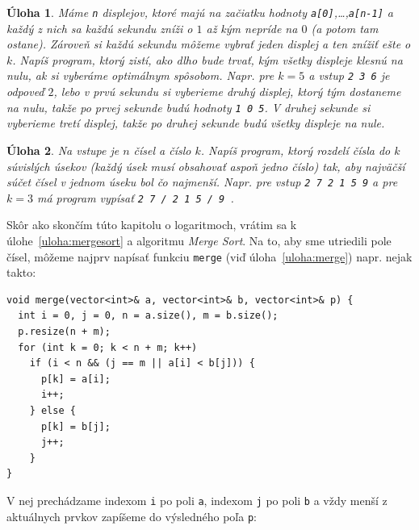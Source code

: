 \documentclass[10pt]{article}
\def\ods{\vspace*{10pt}}
\newtheorem{uloha}{Úloha}
\begin{document}
\begin{uloha}
  Máme {\tt n} displejov, ktoré majú na začiatku hodnoty {\tt a[0]},\ldots,{\tt a[n-1]}
  a každý z nich sa každú sekundu zníži o $1$ až kým nepríde na $0$ (a potom tam ostane).
  Zároveň si každú sekundu môžeme vybrať jeden displej a ten znížiť ešte o $k$.
  Napíš program, ktorý zistí, ako dlho bude trvať, kým všetky displeje klesnú na nulu,
  ak si vyberáme optimálnym spôsobom. Napr. pre $k=5$ a vstup {\tt 2 3 6} je odpoveď
  $2$, lebo v prvú sekundu si vyberieme druhý displej, ktorý tým dostaneme na nulu,
  takže po prvej sekunde budú hodnoty {\tt 1 0 5}. V druhej sekunde si vyberieme 
  tretí displej, takže po druhej sekunde budú všetky displeje na nule.
\end{uloha}

\begin{uloha}
Na vstupe je $n$ čísel a číslo $k$. Napíš program, ktorý rozdelí čísla do $k$
  súvislých úsekov (každý úsek musí obsahovať aspoň jedno číslo) tak, aby 
  najväčší súčet čísel v jednom úseku bol čo najmenší. Napr. pre vstup
  {\tt 2 7 2 1 5 9} a pre $k=3$ má program vypísať {\tt 2 7 / 2 1 5 / 9 }.
\end{uloha}

\ods
Skôr ako skončím túto kapitolu o logaritmoch, vrátim sa k úlohe~\ref{uloha:mergesort}
a algoritmu {\em Merge Sort}. Na to, aby sme utriedili pole čísel, môžeme 
najprv napísať funkciu {\tt merge} (viď úloha~\ref{uloha:merge}) napr. nejak takto:

\begin{lstlisting}
void merge(vector<int>& a, vector<int>& b, vector<int>& p) {
  int i = 0, j = 0, n = a.size(), m = b.size();
  p.resize(n + m);
  for (int k = 0; k < n + m; k++)
    if (i < n && (j == m || a[i] < b[j])) {
      p[k] = a[i];
      i++;
    } else {
      p[k] = b[j];
      j++;
    }
}
\end{lstlisting}

V nej prechádzame indexom {\tt i} po poli {\tt a}, indexom {\tt j} po poli {\tt b}
a vždy menší z aktuálnych prvkov zapíšeme do výsledného poľa {\tt p}:
\end{document}
